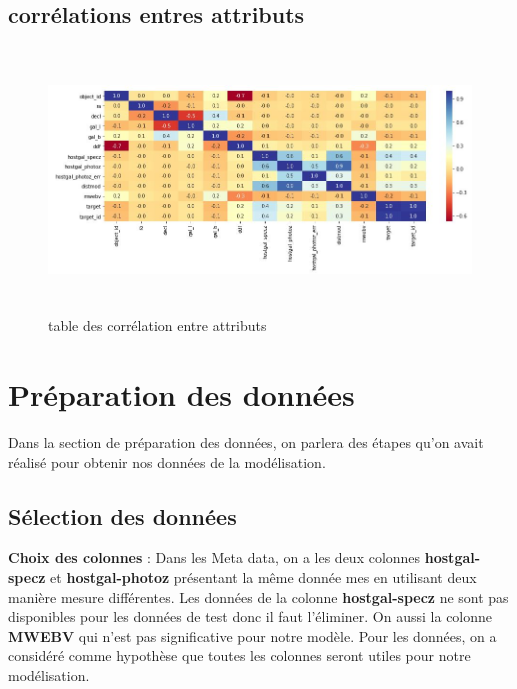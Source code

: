 \subsection{corrélations entres attributs}
\newline
\begin{figure}[!h]
    \centering
    \includegraphics[width=12cm,height=7cm]{report/figures/correlation.jpg}
    \caption{table des corrélation entre attributs}
    \label{fig:my_label}
\end{figure}






















\section{Préparation des données}
Dans la section de préparation des données, on parlera des étapes qu’on avait réalisé pour obtenir nos données de la modélisation.
\subsection{Sélection des données}
\textbf{Choix des colonnes} : Dans les Meta data, on a les deux colonnes \textbf{hostgal-specz} et\textbf{ hostgal-photoz} présentant la même donnée mes en utilisant deux manière mesure différentes. Les données de la colonne \textbf{hostgal-specz} ne sont pas disponibles pour les données de test donc il faut l’éliminer. On aussi la colonne \textbf{MWEBV} qui n’est pas significative pour notre modèle. Pour les données, on a considéré comme hypothèse que toutes les colonnes seront utiles pour notre modélisation.

